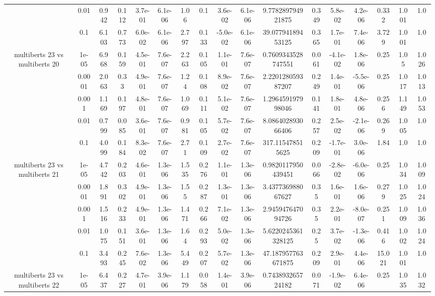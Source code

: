 \begin{tabular}{|c|c|c|c|c|c|c|c|c|c|c|c|c|c|c|c|c|}
 & 0.01 & 0.942 & 0.112 & 3.7e-01 & 6.1e-06 & 1.06 & 0.1 & 3.6e-02 & 6.1e-06 & 9.778289794921875 & 0.349 & 5.8e-02 & 4.2e-06 & 0.332 & 1.001 & 1.0 \\
 & 0.1 & 6.103 & 0.773 & 6.0e-02 & 6.1e-06 & 2.797 & 0.133 & -5.0e-02 & 6.1e-06 & 39.07794189453125 & 0.365 & 1.7e-01 & 7.4e-06 & 3.729 & 1.001 & 1.0 \\
\hline
\multirow{5}{*}{multiberts 23 vs multiberts 20} & 1e-05 & 6.968 & 0.159 & 4.5e-01 & 7.6e-07 & 2.263 & 0.105 & 1.1e-01 & 7.6e-07 & 0.7609343528747551 & 0.061 & -4.1e-02 & 1.8e-06 & 0.25 & 1.05 & 1.026 \\
 & 0.0001 & 2.063 & 0.33 & 4.9e-01 & 7.6e-07 & 1.24 & 0.108 & 8.9e-02 & 7.6e-07 & 2.220128059387207 & 0.249 & 1.4e-01 & -5.5e-06 & 0.25 & 1.017 & 1.013 \\
 & 0.001 & 1.169 & 0.197 & 4.8e-01 & 7.6e-07 & 1.069 & 0.111 & 5.1e-02 & 7.6e-07 & 1.296459197998046 & 0.141 & 1.8e-01 & 4.8e-06 & 0.256 & 1.149 & 1.053 \\
 & 0.01 & 0.799 & 0.085 & 3.6e-01 & 7.6e-07 & 0.981 & 0.105 & 5.7e-02 & 7.6e-07 & 8.086402893066406 & 0.257 & 2.5e-02 & -2.1e-06 & 0.269 & 1.005 & 1.0 \\
 & 0.1 & 4.099 & 0.184 & 8.3e-02 & 7.6e-07 & 2.71 & 0.109 & 2.7e-02 & 7.6e-07 & 317.115478515625 & 0.209 & -1.7e-01 & 3.0e-06 & 1.84 & 1.0 & 1.0 \\
\hline
\multirow{5}{*}{multiberts 23 vs multiberts 21} & 1e-05 & 4.742 & 0.203 & 4.6e-01 & 1.3e-06 & 1.535 & 0.276 & 1.1e-01 & 1.3e-06 & 0.9820117950439451 & 0.066 & -2.8e-02 & -6.0e-06 & 0.25 & 1.034 & 1.009 \\
 & 0.0001 & 1.891 & 0.302 & 4.9e-01 & 1.3e-06 & 1.55 & 0.287 & 1.3e-01 & 1.3e-06 & 3.437736988067627 & 0.35 & 1.6e-01 & 1.6e-06 & 0.279 & 1.025 & 1.024 \\
 & 0.001 & 1.516 & 0.233 & 4.9e-01 & 1.3e-06 & 1.471 & 0.266 & 7.1e-02 & 1.3e-06 & 2.945947647094726 & 0.35 & 2.2e-01 & -8.0e-07 & 0.251 & 1.009 & 1.036 \\
 & 0.01 & 1.075 & 0.151 & 3.6e-01 & 1.3e-06 & 1.64 & 0.293 & 5.0e-02 & 1.3e-06 & 5.6220245361328125 & 0.25 & 3.7e-02 & -1.3e-06 & 0.416 & 1.002 & 1.024 \\
 & 0.1 & 3.493 & 0.245 & 7.6e-02 & 1.3e-06 & 5.449 & 0.207 & 5.7e-02 & 1.3e-06 & 47.187957763671875 & 0.209 & 2.9e-01 & 4.4e-06 & 15.021 & 1.001 & 1.0 \\
\hline
\multirow{5}{*}{multiberts 23 vs multiberts 22} & 1e-05 & 6.437 & 0.227 & 4.7e-01 & 3.9e-06 & 1.179 & 0.058 & 1.4e-01 & 3.9e-06 & 0.743893265724182 & 0.071 & -1.9e-02 & 6.4e-06 & 0.25 & 1.035 & 1.032 \\

\end{tabular}
